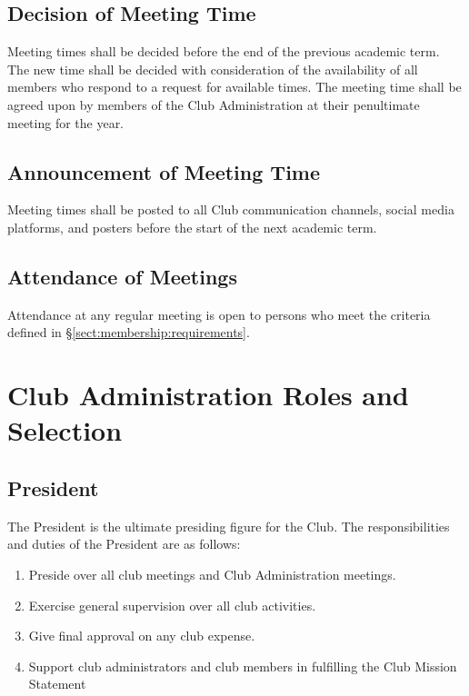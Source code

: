 \documentclass[english,11pt]{article}
\begin{document}
\subsection{Decision of Meeting Time} \label{sect:meetings:decision}
Meeting times shall be decided before the end of the previous academic term.
The new time shall be decided with consideration of the availability of all members who respond to a request for available times.
The meeting time shall be agreed upon by members of the Club Administration at their penultimate meeting for the year.

\subsection{Announcement of Meeting Time} \label{sect:meetings:announcement}
Meeting times shall be posted to all Club communication channels, social media platforms, and posters before the start of the next academic term.

\subsection{Attendance of Meetings} \label{sect:meetings:attendance}
Attendance at any regular meeting is open to persons who meet the criteria defined in §\ref{sect:membership:requirements}.

\section{Club Administration Roles and Selection} \label{act:cadmin}
\subsection{President} \label{sect:cadmin:president}
The President is the ultimate presiding figure for the Club.
The responsibilities and duties of the President are as follows:

\begin{enumerate}[label=\Alph*.]
    \item Preside over all club meetings and Club Administration meetings.
    \item Exercise general supervision over all club activities.
    \item Give final approval on any club expense.
\item Support club administrators and club members in fulfilling the Club Mission Statement
\end{enumerate}
\end{document}
